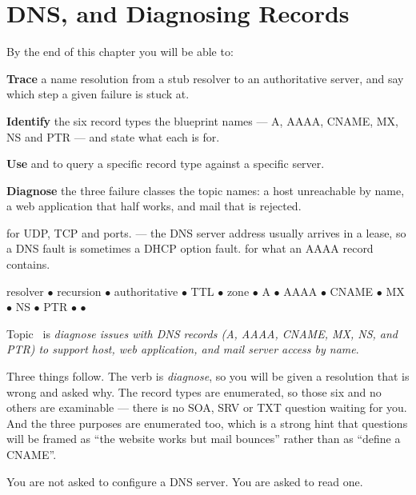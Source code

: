 \chapter{DNS, and Diagnosing Records}\label{ch:dns}

\begin{outcomes}
By the end of this chapter you will be able to:
\begin{tight}
  \item \textbf{Trace} a name resolution from a stub resolver to an authoritative
        server, and say which step a given failure is stuck at.
  \item \textbf{Identify} the six record types the blueprint names --- A, AAAA,
        CNAME, MX, NS and PTR --- and state what each is for.
  \item \textbf{Use}  and  to query a specific record type
        against a specific server.
  \item \textbf{Diagnose} the three failure classes the topic names: a host
        unreachable by name, a web application that half works, and mail that is
        rejected.
\end{tight}
\end{outcomes}

\begin{prereq}
 for UDP, TCP and ports.  --- the DNS server address
usually arrives in a lease, so a DNS fault is sometimes a DHCP option fault.
 for what an AAAA record contains.
\end{prereq}

\begin{keyterms}
resolver $\bullet$ recursion $\bullet$ authoritative $\bullet$ TTL $\bullet$
zone $\bullet$ A $\bullet$ AAAA $\bullet$ CNAME $\bullet$ MX $\bullet$ NS
$\bullet$ PTR $\bullet$  $\bullet$ 
\end{keyterms}

\begin{examnote}
Topic~ is \emph{diagnose issues with DNS records (A, AAAA, CNAME, MX, NS,
and PTR) to support host, web application, and mail server access by name}.

Three things follow. The verb is \emph{diagnose}, so you will be given a
resolution that is wrong and asked why. The record types are enumerated, so those
six and no others are examinable --- there is no SOA, SRV or TXT question waiting
for you. And the three purposes are enumerated too, which is a strong hint that
questions will be framed as ``the website works but mail bounces'' rather than as
``define a CNAME''.

You are not asked to configure a DNS server. You are asked to read one.
\end{examnote}

